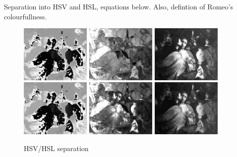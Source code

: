 \documentclass[11pt,a4paper]{report}
\begin{document}
\begin{multicols}{2}
Separation into HSV and HSL, equations below.  Also, defintion of Romeo's
colourfullness.

\begin{figure}[tbp]
\centering
\includegraphics[width=0.30\textwidth]{H_caravaggio_1962_139_1}
\includegraphics[width=0.30\textwidth]{SHSV_caravaggio_1962_139_1}
\includegraphics[width=0.30\textwidth]{V_caravaggio_1962_139_1}
\includegraphics[width=0.30\textwidth]{H_caravaggio_1962_139_1}
\includegraphics[width=0.30\textwidth]{SHSL_caravaggio_1962_139_1}
\includegraphics[width=0.30\textwidth]{L_caravaggio_1962_139_1}
\caption[HSV/HSL separation]{HSV/HSL separation}
\label{hsvl}
\end{figure}


\end{multicols}
\end{document}
